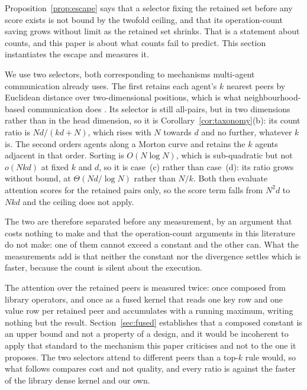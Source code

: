 Proposition~\ref{prop:escape} says that a selector fixing the retained set
before any score exists is not bound by the twofold ceiling, and that its
operation-count saving grows without limit as the retained set shrinks. That is
a statement about counts, and this paper is about what counts fail to predict.
This section instantiates the escape and measures it.

We use two selectors, both corresponding to mechanisms multi-agent
communication already uses. The first retains each agent's $k$ nearest peers by
Euclidean distance over two-dimensional positions, which is what
neighbourhood-based communication does \citep{jiang2018dgn,jiang2018atoc}. Its
selector is still all-pairs, but in two dimensions rather than in the head
dimension, so it is Corollary~\ref{cor:taxonomy}(b): its count ratio is
$Nd/(kd+N)$, which rises with $N$ towards $d$ and no further, whatever $k$ is.
The second orders agents along a Morton curve and retains the $k$ agents
adjacent in that order. Sorting is $O(N\log N)$, which is sub-quadratic but not
$o(Nkd)$ at fixed $k$ and $d$, so it is case~(c) rather than case~(d): its ratio
grows without bound, at $\Theta(Nd/\log N)$ rather than $N/k$. Both then
evaluate attention scores for the retained pairs only, so the score term falls
from $N^2d$ to $Nkd$ and the ceiling does not apply.

The two are therefore separated before any measurement, by an argument that
costs nothing to make and that the operation-count arguments in this literature
do not make: one of them cannot exceed a constant and the other can. What the
measurements add is that neither the constant nor the divergence settles which
is faster, because the count is silent about the execution.

The attention over the retained peers is measured twice: once composed from
library operators, and once as a fused kernel that reads one key row and one
value row per retained peer and accumulates with a running maximum, writing
nothing but the result. Section~\ref{sec:fused} establishes that a composed
constant is an upper bound and not a property of a design, and it would be
incoherent to apply that standard to the mechanism this paper criticises and not
to the one it proposes. The two selectors attend to different peers than a
top-$k$ rule would, so what follows compares cost and not quality, and every
ratio is against the faster of the library dense kernel and our own.

\begin{table}[t]
\centering\small
\caption{Selecting before scoring, at \PrescoreK{} retained peers, every ratio
against the better of the vendor library and our own dense kernel at the tiling
the search of Section~\ref{sec:fused} found. Composing the attention stage from
library operators costs an order of magnitude more than fusing it, and the
difference decides the conclusion: composed, the attention is slower than dense
attention at every configuration measured; fused, it is up to sixteen times
faster.}
\label{tab:prescore}
\resizebox{\linewidth}{!}{}
\end{table}

